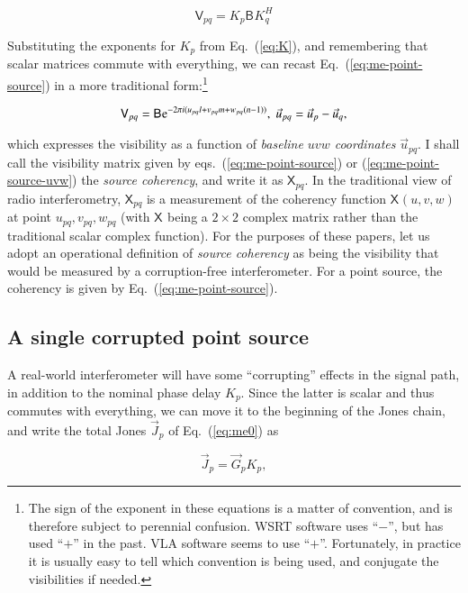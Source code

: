 \documentclass{aa}
\newcommand{\herm}{H}
\newcommand{\jones}[2]{\vec {#1}_{#2}}
\newcommand{\coh}[2]{\mathsf{{#1}}_{{#2}}}
\begin{document}
  \begin{equation}\label{eq:me-point-source}
  \coh{V}{pq} = K_p \coh{B}{}  K^\herm_q
  \end{equation}

Substituting the exponents for $K_p$ from Eq.~(\ref{eq:K}), and remembering that scalar matrices commute with everything, we can recast Eq.~(\ref{eq:me-point-source}) in a more traditional form:\footnote{The sign of the exponent in these equations is a matter of convention, and is therefore subject to perennial confusion. WSRT software uses ``$-$'', but has used ``$+$'' in the past. VLA software seems to use ``$+$''. Fortunately, in practice it is usually easy to tell which convention is being used, and conjugate the visibilities if needed.}

  \begin{equation}\label{eq:me-point-source-uvw}
  \coh{V}{pq} = \coh{B}{}  {\rm e}^{-2\pi i(u_{pq} l+v_{pq} m+w_{pq} (n-1))},\;\vec u_{pq} = \vec u_p - \vec u_q,
  \end{equation}
 
which expresses the visibility as a function of {\em baseline $uvw$ coordinates} $\vec u_{pq}$. I shall call the visibility matrix given by eqs.~(\ref{eq:me-point-source}) or (\ref{eq:me-point-source-uvw}) the {\em source coherency}, and write it as $\coh{X}{pq}$. In the traditional view of radio interferometry, $\coh{X}{pq}$ is a measurement of the coherency function $\coh{X}{}(u,v,w)$ at point $u_{pq},v_{pq},w_{pq}$ (with $\coh{X}{}$ being a $2\times2$ complex matrix rather than the traditional scalar complex function). For the purposes of these papers, let us adopt an operational definition of {\em source coherency} as being the visibility that would be measured by a corruption-free interferometer. For a point source, the coherency is given by Eq.~(\ref{eq:me-point-source}).

\subsection{A single corrupted point source}

A real-world interferometer will have some ``corrupting'' effects in the signal path, in addition to the nominal phase delay $K_p$. Since the latter is scalar and thus commutes with everything, we can move it to the beginning of the Jones chain, and write the total Jones $\jones{J}{p}$ of Eq.~(\ref{eq:me0}) as

\[
\jones{J}{p} = \jones{G}{p} K_p,
\]
\end{document}
